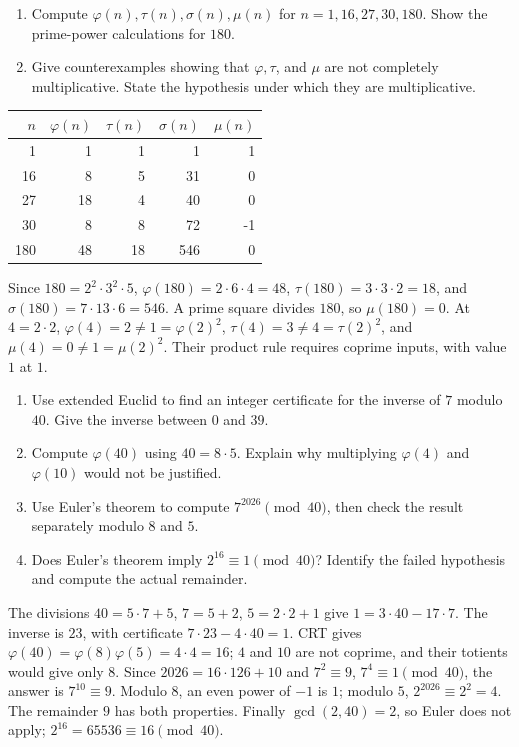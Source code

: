 \begin{enumerate}
 \item Compute $\varphi(n),\tau(n),\sigma(n),\mu(n)$ for
 $n=1,16,27,30,180$. Show the prime-power calculations for $180$. 
 \item Give counterexamples showing that $\varphi,\tau$, and $\mu$
 are not completely multiplicative. State the hypothesis under which
 they are multiplicative. 
\end{enumerate}
\begin{solution}
\begin{center}
\begin{tabular}{rrrrr}
\toprule $n$&$\varphi(n)$&$\tau(n)$&$\sigma(n)$&$\mu(n)$\\\midrule
1&1&1&1&1\\16&8&5&31&0\\27&18&4&40&0\\
30&8&8&72&-1\\180&48&18&546&0\\\bottomrule
\end{tabular}
\end{center}
Since $180=2^2\cdot3^2\cdot5$,
$\varphi(180)=2\cdot6\cdot4=48$,
$\tau(180)=3\cdot3\cdot2=18$, and
$\sigma(180)=7\cdot13\cdot6=546$. A prime square divides $180$,
so $\mu(180)=0$. At $4=2\cdot2$,
$\varphi(4)=2\ne1=\varphi(2)^2$,
$\tau(4)=3\ne4=\tau(2)^2$, and
$\mu(4)=0\ne1=\mu(2)^2$.
Their product rule requires coprime inputs, with value $1$ at $1$.
\end{solution}

\begin{enumerate}
 \item Use extended Euclid to find an integer certificate for the inverse
 of $7$ modulo $40$. Give the inverse between $0$ and $39$. 
 \item Compute $\varphi(40)$ using $40=8\cdot5$. Explain why multiplying
 $\varphi(4)$ and $\varphi(10)$ would not be justified. 
 \item Use Euler's theorem to compute $7^{2026}\pmod{40}$, then check
 the result separately modulo $8$ and $5$. 
 \item Does Euler's theorem imply $2^{16}\equiv1\pmod{40}$?
 Identify the failed hypothesis and compute the actual remainder. 
\end{enumerate}
\begin{solution}
The divisions $40=5\cdot7+5$, $7=5+2$, $5=2\cdot2+1$ give
$1=3\cdot40-17\cdot7$. The inverse is $23$, with certificate
$7\cdot23-4\cdot40=1$.
CRT gives $\varphi(40)=\varphi(8)\varphi(5)=4\cdot4=16$;
$4$ and $10$ are not coprime, and their totients would give only $8$.
Since $2026=16\cdot126+10$ and $7^2\equiv9$, $7^4\equiv1\pmod{40}$,
the answer is $7^{10}\equiv9$. Modulo $8$, an even power of $-1$
is $1$; modulo $5$, $2^{2026}\equiv2^2=4$. The remainder $9$ has
both properties. Finally $\gcd(2,40)=2$, so Euler does not apply;
$2^{16}=65536\equiv16\pmod{40}$.
\end{solution}

